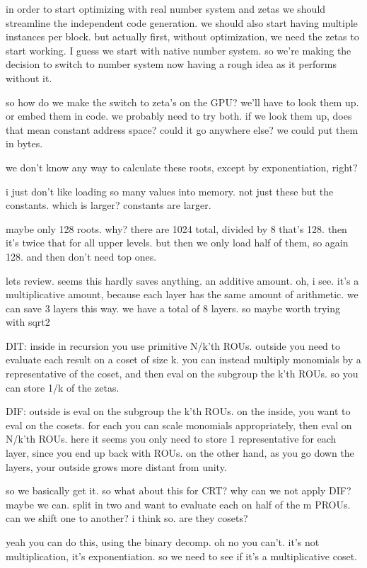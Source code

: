 in order to start optimizing with real number system and zetas we should streamline the independent code generation.
we should also start having multiple instances per block.
but actually first, without optimization, we need the zetas to start working. I guess we start with native number system. 
so we're making the decision to switch to number system now having a rough idea as it performs without it.

so how do we make the switch to zeta's on the GPU?
we'll have to look them up. or embed them in code. we probably need to try both.
if we look them up, does that mean constant address space?
could it go anywhere else? we could put them in bytes.

we don't know any way to calculate these roots, except by exponentiation, right?

i just don't like loading so many values into memory. not just these but the constants.
which is larger? constants are larger.

maybe only 128 roots.
why?
there are 1024 total, divided by 8 that's 128. then it's twice that for all upper levels. 
but then we only load half of them, so again 128. and then don't need top ones. 

lets review. seems this hardly saves anything. an additive amount. 
oh, i see. it's a multiplicative amount, because each layer has the same amount of arithmetic. we can save 3 layers this way. we have a total of 8 layers.
so maybe worth trying with sqrt{2}


DIT:
inside in recursion you use primitive N/k'th ROUs.
outside you need to evaluate each result on a coset of size k.
you can instead multiply monomials by a representative of the coset, and then eval on the subgroup the k'th ROUs. 
so you can store 1/k of the zetas.

DIF:
outside is eval on the subgroup the k'th ROUs.
on the inside, you want to eval on the cosets. for each you can scale monomials appropriately, then eval on N/k'th ROUs.
here it seems you only need to store 1 representative for each layer, since you end up back with ROUs.
on the other hand, as you go down the layers, your outside grows more distant from unity.

so we basically get it. 
so what about this for CRT?
why can we not apply DIF?
maybe we can. split in two and want to evaluate each on half of the m PROUs.
can we shift one to another? 
i think so. are they cosets? 

yeah you can do this, using the binary decomp.
oh no you can't. it's not multiplication, it's exponentiation.
so we need to see if it's a multiplicative coset.

